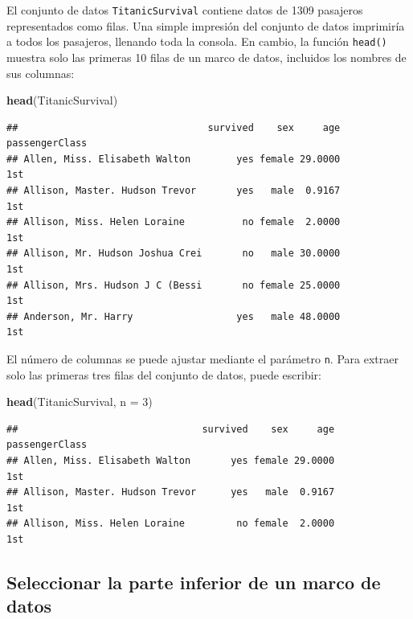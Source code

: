 \documentclass[
]{book}
\newenvironment{Shaded}{\begin{snugshade}}{\end{snugshade}}
\newcommand{\DataTypeTok}[1]{\textcolor[rgb]{0.13,0.29,0.53}{#1}}
\newcommand{\DecValTok}[1]{\textcolor[rgb]{0.00,0.00,0.81}{#1}}
\newcommand{\KeywordTok}[1]{\textcolor[rgb]{0.13,0.29,0.53}{\textbf{#1}}}
\newcommand{\NormalTok}[1]{#1}
\begin{document}
El conjunto de datos \texttt{TitanicSurvival} contiene datos de 1309 pasajeros representados como filas. Una simple impresión del conjunto de datos imprimiría a todos los pasajeros, llenando toda la consola. En cambio, la función \texttt{head()} muestra solo las primeras 10 filas de un marco de datos, incluidos los nombres de sus columnas:

\begin{Shaded}
\begin{Highlighting}[]
\KeywordTok{head}\NormalTok{(TitanicSurvival)}
\end{Highlighting}
\end{Shaded}

\begin{verbatim}
##                                 survived    sex     age passengerClass
## Allen, Miss. Elisabeth Walton        yes female 29.0000            1st
## Allison, Master. Hudson Trevor       yes   male  0.9167            1st
## Allison, Miss. Helen Loraine          no female  2.0000            1st
## Allison, Mr. Hudson Joshua Crei       no   male 30.0000            1st
## Allison, Mrs. Hudson J C (Bessi       no female 25.0000            1st
## Anderson, Mr. Harry                  yes   male 48.0000            1st
\end{verbatim}

El número de columnas se puede ajustar mediante el parámetro \texttt{n}. Para extraer solo las primeras tres filas del conjunto de datos, puede escribir:

\begin{Shaded}
\begin{Highlighting}[]
\KeywordTok{head}\NormalTok{(TitanicSurvival, }\DataTypeTok{n =} \DecValTok{3}\NormalTok{)}
\end{Highlighting}
\end{Shaded}

\begin{verbatim}
##                                survived    sex     age passengerClass
## Allen, Miss. Elisabeth Walton       yes female 29.0000            1st
## Allison, Master. Hudson Trevor      yes   male  0.9167            1st
## Allison, Miss. Helen Loraine         no female  2.0000            1st
\end{verbatim}

\hypertarget{seleccionar-la-parte-inferior-de-un-marco-de-datos}{%
\subsection{Seleccionar la parte inferior de un marco de datos}\label{seleccionar-la-parte-inferior-de-un-marco-de-datos}}
\end{document}
